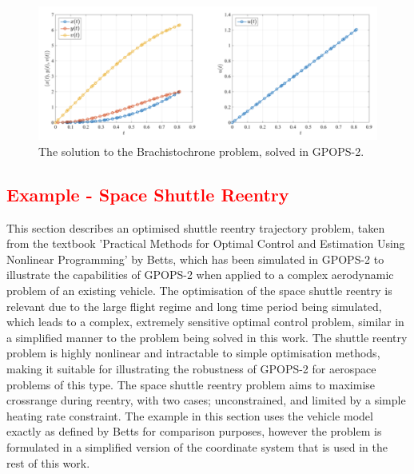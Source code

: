 \begin{figure}[ht]
	\centering
	\includegraphics[width=0.9\linewidth]{figures/4_LODESTAR/Brachistochrone}
	\caption{The solution to the Brachistochrone problem, solved in GPOPS-2\cite{Rao2010}.}
	\label{fig:Brachistochrone}
\end{figure}




\textcolor{red}{\section{Example - Space Shuttle Reentry}}

This section describes an optimised shuttle reentry trajectory problem, taken from the textbook 'Practical Methods for Optimal Control and Estimation Using Nonlinear Programming' by Betts\cite{Betts2009}, which has been simulated in GPOPS-2 to illustrate the capabilities of GPOPS-2 when applied to a complex aerodynamic problem of an existing vehicle. The optimisation of the space shuttle reentry is relevant due to the large flight regime and long time period being simulated, which leads to a complex, extremely sensitive optimal control problem\cite{Betts2009}, similar in a simplified manner to the problem being solved in this work. The shuttle reentry problem is highly nonlinear and intractable to simple optimisation methods\cite{Betts2009}, making it suitable for illustrating the robustness of GPOPS-2 for aerospace problems of this type. 
The space shuttle reentry problem aims to maximise crossrange during reentry, with two cases; unconstrained, and limited by a simple heating rate constraint. The example in this section uses the vehicle model exactly as defined by Betts\cite{Betts2009} for comparison purposes, however the problem is formulated in a simplified version of the coordinate system that is used in the rest of this work. 



